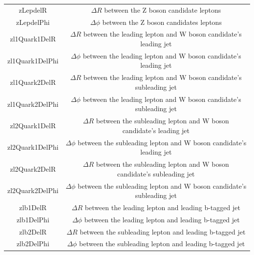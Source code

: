 \begin{table}[htbp]
{\begin{tabular}{cc}
    zLepdelR & $\Delta R$ between the Z boson candidate leptons \\
    zLepdelPhi & $\Delta \phi$ between the Z boson candidates leptons \\
    zl1Quark1DelR & $\Delta R$ between the leading lepton and W boson candidate's leading jet \\
    zl1Quark1DelPhi & $\Delta \phi$ between the leading lepton and W boson candidate's leading jet \\
    zl1Quark2DelR & $\Delta R$ between the leading lepton and W boson candidate's subleading jet \\
    zl1Quark2DelPhi & $\Delta \phi$ between the leading lepton and W boson candidate's subleading jet \\
    zl2Quark1DelR & $\Delta R$ between the subleading lepton and W boson candidate's leading jet \\
    zl2Quark1DelPhi & $\Delta \phi$ between the subleading lepton and W boson candidate's leading jet \\
    zl2Quark2DelR & $\Delta R$ between the subleading lepton and W boson candidate's subleading jet \\
    zl2Quark2DelPhi & $\Delta \phi$ between the subleading lepton and W boson candidate's subleading jet \\
    zlb1DelR & $\Delta R$ between the leading lepton and leading b-tagged jet \\
    zlb1DelPhi & $\Delta \phi$ between the leading lepton and leading b-tagged jet \\
    zlb2DelR & $\Delta R$ between the subleading lepton and leading b-tagged jet\\
    zlb2DelPhi & $\Delta \phi$ between the subleading lepton and leading b-tagged jet \\
   \hline
 \end{tabular}}
\end{table}

